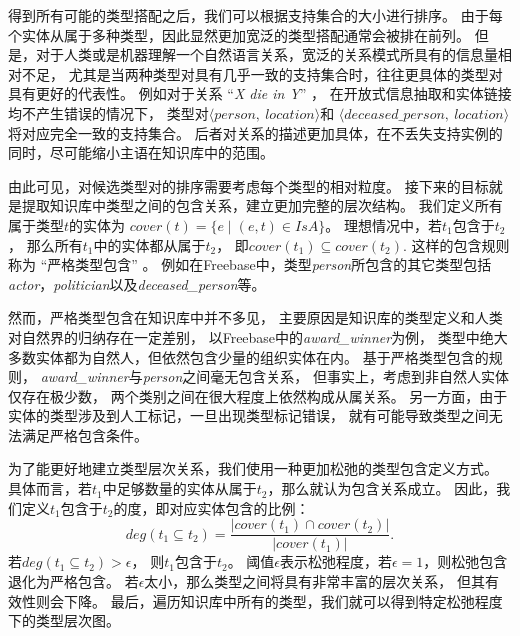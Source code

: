 得到所有可能的类型搭配之后，我们可以根据支持集合的大小进行排序。
由于每个实体从属于多种类型，因此显然更加宽泛的类型搭配通常会被排在前列。
但是，对于人类或是机器理解一个自然语言关系，宽泛的关系模式所具有的信息量相对不足，
尤其是当两种类型对具有几乎一致的支持集合时，往往更具体的类型对具有更好的代表性。
例如对于关系 ``\textit{X die in Y}'' ，
在开放式信息抽取和实体链接均不产生错误的情况下，
类型对$\langle person,\ location \rangle$和
$\langle deceased\_person,\ location \rangle$将对应完全一致的支持集合。
后者对关系的描述更加具体，在不丢失支持实例的同时，尽可能缩小主语在知识库中的范围。

由此可见，对候选类型对的排序需要考虑每个类型的相对粒度。
接下来的目标就是提取知识库中类型之间的包含关系，建立更加完整的层次结构。
我们定义所有属于类型$t$的实体为
$cover(t) = \{e\; |\; (e, t) \in IsA\}$。
理想情况中，若$t_1$包含于$t_2$，
那么所有$t_1$中的实体都从属于$t_2$，
即$cover(t_1) \subseteq cover(t_2)$.
这样的包含规则称为 ``{严格类型包含}'' 。
例如在Freebase中，类型\textit{person}所包含的其它类型包括
\textit{actor}，\textit{politician}以及\textit{deceased\_person}等。

然而，严格类型包含在知识库中并不多见，
主要原因是知识库的类型定义和人类对自然界的归纳存在一定差别，
以Freebase中的\textit{award\_winner}为例，
类型中绝大多数实体都为自然人，但依然包含少量的组织实体在内。
基于严格类型包含的规则，
\textit{award\_winner}与\textit{person}之间毫无包含关系，
但事实上，考虑到非自然人实体仅存在极少数，
两个类别之间在很大程度上依然构成从属关系。
另一方面，由于实体的类型涉及到人工标记，一旦出现类型标记错误，
就有可能导致类型之间无法满足严格包含条件。


为了能更好地建立类型层次关系，我们使用一种更加松弛的类型包含定义方式。
具体而言，若$t_1$中足够数量的实体从属于$t_2$，那么就认为包含关系成立。
因此，我们定义$t_1$包含于$t_2$的度，即对应实体包含的比例：
\begin{equation}
deg(t_1 \subseteq t_2) = \frac{\left|cover(t_1) \cap cover(t_2)\right|} {\left|cover(t_1)\right|}.
\end{equation}
若$deg(t_1 \subseteq t_2) > \epsilon$，
则$t_1$包含于$t_2$。
阈值$\epsilon$表示松弛程度，若$\epsilon=1$，则松弛包含退化为严格包含。
若$\epsilon$太小，那么类型之间将具有非常丰富的层次关系，
但其有效性则会下降。
最后，遍历知识库中所有的类型，我们就可以得到特定松弛程度下的类型层次图。

